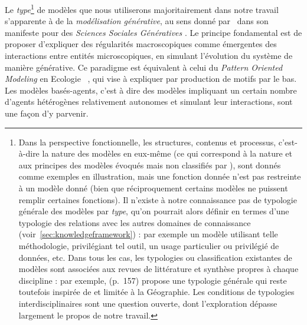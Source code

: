Le \emph{type}\footnote{Dans la perspective fonctionnelle, les structures, contenus et processus, c'est-à-dire la nature des modèles en eux-même (ce qui correspond à la nature et aux principes des modèles évoqués mais non classifiés par ), sont donnés comme exemples en illustration, mais une fonction donnée n'est pas restreinte à un modèle donné (bien que réciproquement certains modèles ne puissent remplir certaines fonctions). Il n'existe à notre connaissance pas de typologie générale des modèles par \emph{type}, qu'on pourrait alors définir en termes d'une typologie des relations avec les autres domaines de connaissance (voir~\ref{sec:knowledgeframework}) : par exemple un modèle utilisant telle méthodologie, privilégiant tel outil, un usage particulier ou privilégié de données, etc. Dans tous les cas, les typologies ou classification existantes de modèles sont associées aux revues de littérature et synthèse propres à chaque discipline : par exemple, \cite{harvey1969explanation} (p.~157) propose une typologie générale qui reste toutefois inspirée de et limitée à la Géographie. Les conditions de typologies interdisciplinaires sont une question ouverte, dont l'exploration dépasse largement le propos de notre travail.} de modèles que nous utiliserons majoritairement dans notre travail s'apparente à de la \emph{modélisation générative}, au sens donné par~\cite{epstein2006generative} dans son manifeste pour des \emph{Sciences Sociales Génératives} . Le principe fondamental est de proposer d'expliquer des régularités macroscopiques comme émergentes des interactions entre entités microscopiques, en simulant l'évolution du système de manière générative. Ce paradigme est équivalent à celui du \emph{Pattern Oriented Modeling} en Ecologie~\cite{grimm2005pattern} , qui vise à expliquer par production de motifs par le bas.  Les modèles basés-agents, c'est à dire des modèles impliquant un certain nombre d'agents hétérogènes relativement autonomes et simulant leur interactions, sont une façon d'y parvenir.



